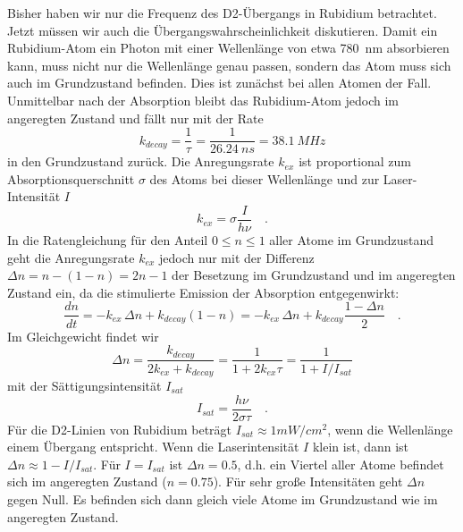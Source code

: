 Bisher haben wir nur die Frequenz des D2-Übergangs in Rubidium betrachtet. Jetzt müssen wir auch die Übergangswahrscheinlichkeit diskutieren. Damit ein Rubidium-Atom ein Photon mit einer Wellenlänge von etwa 780~nm absorbieren kann, muss nicht nur die Wellenlänge genau passen, sondern das Atom muss sich auch im Grundzustand befinden. Dies ist zunächst bei allen Atomen der Fall. Unmittelbar nach der Absorption bleibt das Rubidium-Atom jedoch im angeregten Zustand und fällt nur mit der Rate 
\begin{equation}
	k_{decay} = \frac{1}{\tau} = \frac{1}{26.24~ns} = 38.1~MHz
\end{equation}
in den Grundzustand zurück. Die Anregungsrate $k_{ex}$ ist proportional zum Absorptionsquerschnitt $\sigma$ des Atoms bei dieser Wellenlänge und zur Laser-Intensität $I$
\begin{equation}
	k_{ex} = \sigma \frac{I}{h \nu} \quad .
\end{equation}
In die Ratengleichung für den Anteil $0 \le n \le 1$ aller Atome im Grundzustand geht die Anregungsrate $k_{ex}$ jedoch nur mit der Differenz $\Delta n = n - (1-n) = 2n -1$ der Besetzung im Grundzustand und im angeregten Zustand ein, da die stimulierte Emission der Absorption entgegenwirkt:
\begin{equation}
	\frac{d n}{dt} = - k_{ex} \, \Delta n + k_{decay} (1-n) = - k_{ex} \, \Delta n + k_{decay} \frac{1 - \Delta n}{2} \quad .
\end{equation}
 Im Gleichgewicht findet wir
\begin{equation}
	\Delta n = \frac{k_{decay}}{2 k_{ex}+ k_{decay}} = \frac{1}{1 + 2 k_{ex} \tau } = \frac{1}{1 + I / I_{sat}}
\end{equation}
mit der Sättigungsintensität $I_{sat}$
\begin{equation}
	I_{sat} = \frac{h \nu}{2 \sigma \tau } \quad .
\end{equation}
Für die D2-Linien von Rubidium beträgt $I_{sat} \approx 1 mW/cm^2$, wenn die Wellenlänge einem Übergang entspricht.
Wenn die Laserintensität $I$ klein ist, dann ist $\Delta n \approx 1 - I / I_{sat}$. Für $I = I_{sat}$ ist $\Delta n = 0.5$, d.h. ein Viertel aller Atome befindet sich im angeregten Zustand ($n=0.75$). Für sehr große Intensitäten geht $\Delta n$ gegen Null. Es befinden sich dann gleich viele Atome im Grundzustand wie im angeregten Zustand.

